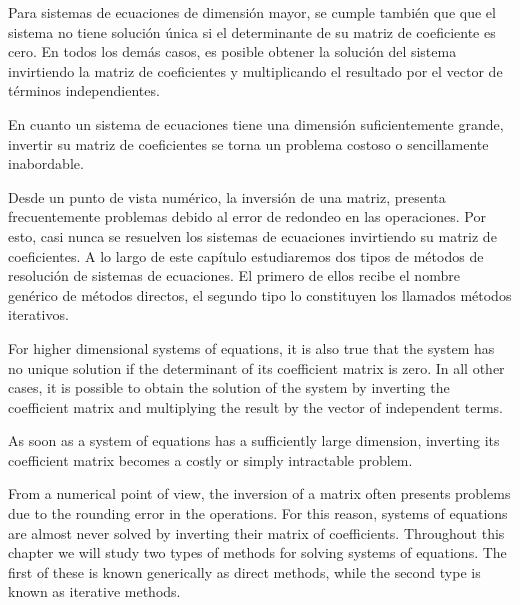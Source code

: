\begin{paracol}{2}
Para sistemas de ecuaciones de dimensión mayor, se cumple también que que el sistema no tiene solución única si el determinante de su matriz de coeficiente es cero. En todos los demás casos, es posible obtener la solución del sistema invirtiendo la matriz de coeficientes y multiplicando el resultado por el vector de términos independientes.

En cuanto un sistema de ecuaciones tiene una dimensión suficientemente grande, invertir su matriz de coeficientes se torna un problema costoso o sencillamente inabordable.

Desde un punto de vista numérico, la inversión de una matriz, presenta frecuentemente problemas debido al error de redondeo en las operaciones. Por esto, casi nunca se resuelven los sistemas de ecuaciones invirtiendo su matriz de coeficientes. A lo largo de este capítulo estudiaremos dos tipos de métodos de resolución de sistemas de ecuaciones. El primero de ellos recibe el nombre genérico de métodos directos, el segundo tipo lo constituyen los llamados métodos iterativos.

\switchcolumn
For higher dimensional systems of equations, it is also true that the system has no unique solution if the determinant of its coefficient matrix is zero. In all other cases, it is possible to obtain the solution of the system by inverting the coefficient matrix and multiplying the result by the vector of independent terms.

As soon as a system of equations has a sufficiently large dimension, inverting its coefficient matrix becomes a costly or simply intractable problem.

From a numerical point of view, the inversion of a matrix often presents problems due to the rounding error in the operations. For this reason, systems of equations are almost never solved by inverting their matrix of coefficients. Throughout this chapter we will study two types of methods for solving systems of equations. The first of these is known generically as direct methods, while the second type is known as iterative methods.
\end{paracol}

